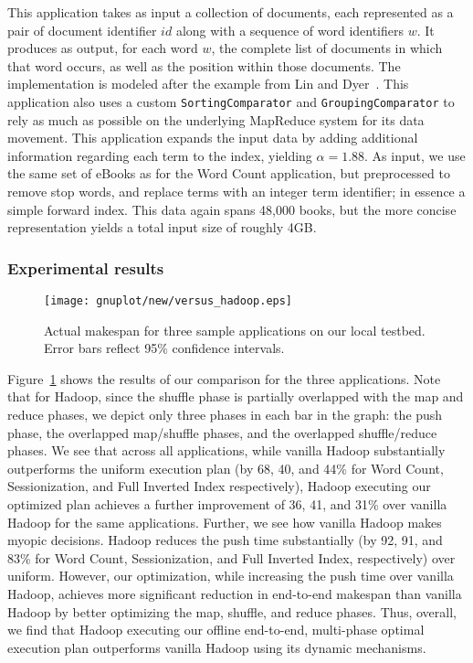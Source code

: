  This application takes as input a
collection of documents, each represented as a pair of document identifier $id$
along with a sequence of word identifiers $w$.
It produces as output, for each word $w$, the complete list of documents in
which that word occurs, as well as the position within those documents.
The implementation is modeled after the example from Lin and
Dyer~\cite{lin2010ditp}.
This application also uses a custom \verb=SortingComparator= and
\verb=GroupingComparator= to rely as much as possible on the underlying
MapReduce system for its data movement.
This application expands the input data by adding additional information
regarding each term to the index, yielding $\alpha=1.88$.
As input, we use the same set of eBooks as for the Word Count application, but
preprocessed to remove stop words, and replace terms with an integer term
identifier; in essence a simple forward index.
This data again spans 48,000 books, but the more concise representation yields
a total input size of roughly 4\unit{GB}.

\subsubsection{Experimental results}

\begin{figure}[htbp]
  \centering
  \texttt{[image: gnuplot/new/versus\_hadoop.eps]}
  \caption{Actual makespan for three sample applications on our local testbed.
  Error bars reflect 95\% confidence intervals.}
  \label{fig:versus_hadoop}
\end{figure}

Figure~\ref{fig:versus_hadoop} shows the results of our comparison for the
three applications.
Note that for Hadoop, since the shuffle phase is partially overlapped with the
map and reduce phases, we depict only three phases in each bar in the graph:
the push phase, the overlapped map/shuffle phases, and the overlapped
shuffle/reduce phases.
We see that across all applications, while vanilla Hadoop substantially
outperforms the uniform execution plan (by 68, 40, and 44\% for Word Count,
Sessionization, and Full Inverted Index respectively), Hadoop executing our
optimized plan achieves a further improvement of 36, 41, and 31\% over vanilla
Hadoop for the same applications.
Further, we see how vanilla Hadoop makes myopic decisions.
Hadoop reduces the push time substantially (by 92, 91, and 83\% for Word Count,
Sessionization, and Full Inverted Index, respectively) over uniform.
However, our optimization, while increasing the push time over vanilla Hadoop,
achieves more significant reduction in end-to-end makespan than vanilla Hadoop
by better optimizing the map, shuffle, and reduce phases.
Thus, overall, we find that Hadoop executing our offline end-to-end,
multi-phase optimal execution plan outperforms vanilla Hadoop using its dynamic
mechanisms.

